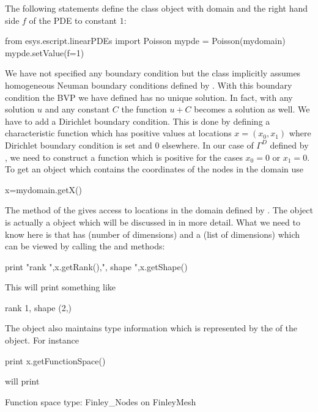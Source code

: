 The following statements define the \Poisson class object  with domain  and
the right hand side $f$ of the PDE to constant $1$: 
\begin{python}
  from esys.escript.linearPDEs import Poisson
  mypde = Poisson(mydomain)
  mypde.setValue(f=1)
\end{python}
We have not specified any boundary condition but the \Poisson class implicitly
assumes homogeneous Neuman boundary conditions defined by .
With this boundary condition the BVP we have
defined has no unique solution.
In fact, with any solution $u$ and any constant $C$ the function $u+C$ becomes
a solution as well.
We have to add a Dirichlet boundary condition.
This is done by defining a characteristic function
which has positive values at locations $x=(x_{0},x_{1})$
where Dirichlet boundary condition is set and $0$ elsewhere.
In our case of $\Gamma^D$ defined by , we need to
construct a function  which is positive for the cases $x_{0}=0$ or $x_{1}=0$.
To get an object  which contains the coordinates of the nodes in the domain use
\begin{python}
  x=mydomain.getX() 
\end{python}
The method  of the \Domain {} gives access to locations
in the domain defined by .
The object  is actually a \Data object which will be discussed in
 in more detail.
What we need to know here is that  has \Rank (number of dimensions) and
a \Shape (list of dimensions) which can be viewed by calling the  and  methods:
\begin{python}
  print "rank ",x.getRank(),", shape ",x.getShape()
\end{python}
This will print something like
\begin{python}
  rank 1, shape (2,)
\end{python}
The \Data object also maintains type information which is represented by the 
\FunctionSpace of the object. For instance
\begin{python}
  print x.getFunctionSpace()
\end{python}
will print 
\begin{python}
  Function space type: Finley_Nodes on FinleyMesh 
\end{python}
